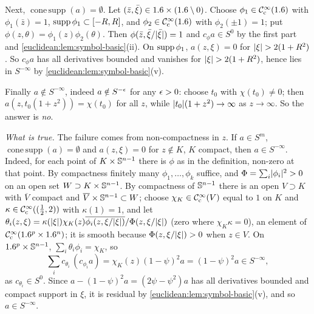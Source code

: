 Next, $\operatorname{cone\,supp}(a)=\emptyset$. Let $(\bar z,\bar\xi)\in1.6\times(1.6\setminus0)$.
Choose $\phi_1\in\mathcal{C}^\infty_{\mathrm{c}}(1.6)$ with $\phi_1(\bar z)=1$, $\operatorname{supp}\phi_1\subset[-R,R]$, and
$\phi_2\in\mathcal{C}^\infty_{\mathrm{c}}(1.6)$ with $\phi_2(\pm1)=1$; put $\phi(z,\theta)=\phi_1(z)\phi_2(\theta)$.
Then $\phi(\bar z,\bar\xi/\lvert \bar\xi\rvert)=1$ and $c_\phi a\in S^0$ by the first part and
\cref{euclidean:lem:symbol-basic}(ii). On $\operatorname{supp}\phi_1$, $a(z,\xi)=0$ for
$\lvert \xi\rvert>2(1+R^2)$. So $c_\phi a$ has all derivatives bounded and vanishes for
$\lvert \xi\rvert>2(1+R^2)$, hence lies in $S^{-\infty}$ by
\cref{euclidean:lem:symbol-basic}(v).

Finally $a\notin S^{-\infty}$, indeed $a\notin S^{-\epsilon}$ for any $\epsilon>0$: choose $t_0$
with $\chi(t_0)\ne0$; then $a(z,t_0(1+z^2))=\chi(t_0)$ for all $z$, while
$\lvert t_0\rvert(1+z^2)\to\infty$ as $z\to\infty$. So the answer is \emph{no}.

\emph{What is true.} The failure comes from non-compactness in $z$. If $a\in S^m$,
$\operatorname{cone\,supp}(a)=\emptyset$ and $a(z,\xi)=0$ for $z\notin K$, $K$ compact,
then $a\in S^{-\infty}$. Indeed, for each point of $K\times\mathbb{S}^{n-1}$ there is $\phi$
as in the definition, non-zero at that point. By compactness finitely many
$\phi_1,\dots,\phi_k$ suffice, and $\Phi=\sum_i\lvert \phi_i\rvert^2>0$ on an open set
$W\supset K\times\mathbb{S}^{n-1}$. By compactness of $\mathbb{S}^{n-1}$ there is an open
$V\supset K$ with $\overline V$ compact and $\overline V\times\mathbb{S}^{n-1}\subset W$;
choose $\chi_K\in\mathcal{C}^\infty_{\mathrm{c}}(V)$ equal to $1$ on $K$ and $\kappa\in\mathcal{C}^\infty_{\mathrm{c}}((\frac12,2))$ with
$\kappa(1)=1$, and let $\theta_i(z,\xi)=\kappa(\lvert \xi\rvert)\chi_K(z)\overline{\phi_i(z,\xi/\lvert \xi\rvert)}/\Phi(z,\xi/\lvert \xi\rvert)$
(zero where $\chi_K\kappa=0$), an element of $\mathcal{C}^\infty_{\mathrm{c}}(1.6^p\times1.6^n)$; it is smooth
because $\Phi(z,\xi/\lvert \xi\rvert)>0$ when $z\in V$. On
$1.6^p\times\mathbb{S}^{n-1}$, $\sum_i\theta_i\phi_i=\chi_K$, so
\begin{equation*}
  \sum_ic_{\theta_i}\,(c_{\phi_i}a)=\chi_K(z)(1-\psi)^2a=(1-\psi)^2a\in S^{-\infty},
\end{equation*}
as $c_{\theta_i}\in S^0$. Since $a-(1-\psi)^2a=(2\psi-\psi^2)a$ has all derivatives
bounded and compact support in $\xi$, it is residual by
\cref{euclidean:lem:symbol-basic}(v), and so $a\in S^{-\infty}$.

\subsection*{}


